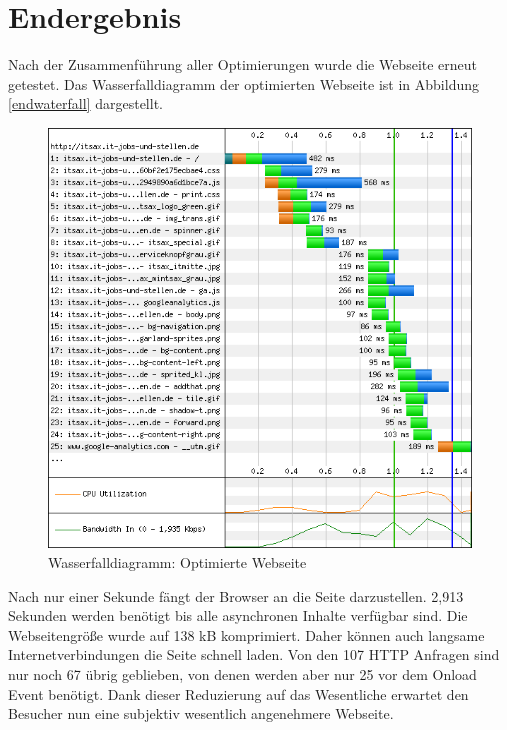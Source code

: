 \section{Endergebnis} 
Nach der Zusammenführung aller Optimierungen wurde die Webseite erneut getestet. Das Wasserfalldiagramm der optimierten Webseite ist in Abbildung \ref{endwaterfall} dargestellt. 
\begin{figure}[!ht]
  \centering
  \includegraphics[scale=0.5]{material/end_waterfall.png}
  \caption{Wasserfalldiagramm: Optimierte Webseite}
  \label{fig:endwaterfall}
\end{figure}
Nach nur einer Sekunde fängt der Browser an die Seite darzustellen. 2,913 Sekunden werden benötigt bis alle asynchronen Inhalte verfügbar sind. Die Webseitengröße wurde auf 138 kB komprimiert. Daher können auch langsame Internetverbindungen die Seite schnell laden. Von den 107 HTTP Anfragen sind nur noch 67 übrig geblieben, von denen werden aber nur 25 vor dem Onload Event benötigt. Dank dieser Reduzierung auf das Wesentliche erwartet den Besucher nun eine subjektiv wesentlich angenehmere Webseite. 
